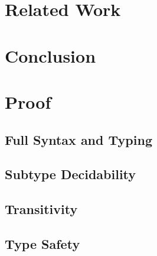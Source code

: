 \documentclass[runningheads]{llncs}
\begin{document}
\section{Related Work}

\section{Conclusion}




\appendix

\section{Proof}

\subsection{Full \Fsub Syntax and Typing}
\label{app:fsub}

\subsection{Subtype Decidability}

\subsection{Transitivity}

\subsection{Type Safety}

%
%
%
% 
% 
%
\begin{thebibliography}{8}
\end{thebibliography}
\end{document}
